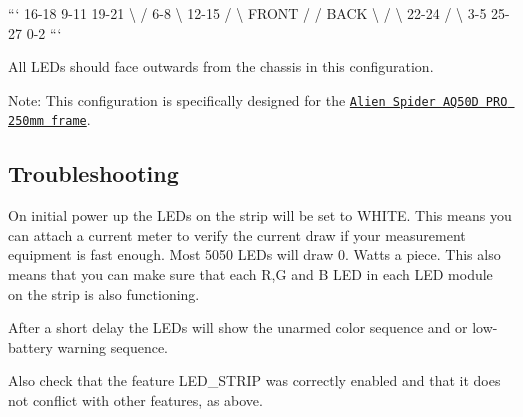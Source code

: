 ``` 16-\/18 9-\/11 19-\/21 \textbackslash{} / 6-\/8 \textbackslash{} 12-\/15 / \textbackslash{} F\+R\+O\+N\+T / / B\+A\+C\+K \textbackslash{} / \textbackslash{} 22-\/24 / \textbackslash{} 3-\/5 25-\/27 0-\/2 ```

All L\+E\+Ds should face outwards from the chassis in this configuration.

Note\+: This configuration is specifically designed for the \href{http://www.goodluckbuy.com/alien-spider-aq50d-pro-250mm-mini-quadcopter-carbon-fiber-micro-multicopter-frame.html}{\tt Alien Spider A\+Q50\+D P\+R\+O 250mm frame}.

\subsection*{Troubleshooting}

On initial power up the L\+E\+Ds on the strip will be set to W\+H\+I\+T\+E. This means you can attach a current meter to verify the current draw if your measurement equipment is fast enough. Most 5050 L\+E\+Ds will draw 0. Watts a piece. This also means that you can make sure that each R,G and B L\+E\+D in each L\+E\+D module on the strip is also functioning.

After a short delay the L\+E\+Ds will show the unarmed color sequence and or low-\/battery warning sequence.

Also check that the feature {\ttfamily L\+E\+D\+\_\+\+S\+T\+R\+I\+P} was correctly enabled and that it does not conflict with other features, as above. 